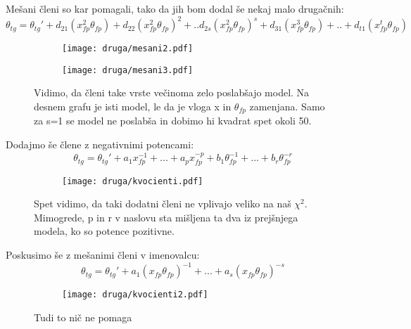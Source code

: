 \documentclass{article}
\begin{document}
Mešani členi so kar pomagali, tako da jih bom dodal še nekaj malo drugačnih:
\begin{equation*}
\theta_{tg} = \theta_{tg}' + d_{21}(x_{fp}^2 \theta_{fp}) + d_{22} (x_{fp}^2 \theta_{fp})^2 + .. d_{2s}(x_{fp}^2 \theta_{fp})^s + d_{31}(x_{fp}^3 \theta_{fp}) + .. + d_{t1}(x_{fp}^t \theta_{fp})
\end{equation*}

\begin{figure}[H]
\begin{subfigure}{.49\textwidth}
\texttt{[image: druga/mesani2.pdf]}
\end{subfigure}
\begin{subfigure}{.49\textwidth}
\texttt{[image: druga/mesani3.pdf]}
\end{subfigure}
\caption*{Vidimo, da členi take vrste večinoma zelo poslabšajo model. Na desnem grafu je isti model, le da je vloga x in $\theta_{fp}$ zamenjana. Samo za s=1 se model ne poslabša in dobimo hi kvadrat spet okoli 50.}
\end{figure}

Dodajmo še člene z negativnimi potencami:
\begin{equation*}
\theta_{tg} = \theta_{tg}' + a_1 x_{fp}^{-1} + ... + a_p x_{fp}^{-p} + b_1 \theta_{fp}^{-1} + ... + b_r \theta_{fp}^{-r}
\end{equation*}

\begin{figure}[H]
\begin{subfigure}{\textwidth}
\texttt{[image: druga/kvocienti.pdf]}
\end{subfigure}
\caption*{Spet vidimo, da taki dodatni členi ne vplivajo veliko na naš $\chi^2$. Mimogrede, p in r v naslovu sta mišljena ta dva iz prejšnjega modela, ko so potence pozitivne.}
\end{figure}
\newpage
Poskusimo še z mešanimi členi v imenovalcu:
\begin{equation*}
\theta_{tg} = \theta_{tg}' + a_1 (x_{fp}\theta_{fp})^{-1} + ... + a_s (x_{fp}\theta_{fp})^{-s}
\end{equation*}

\begin{figure}[H]
\begin{subfigure}{\textwidth}
\texttt{[image: druga/kvocienti2.pdf]}
\end{subfigure}
\caption*{Tudi to nič ne pomaga}
\end{figure}
\end{document}
